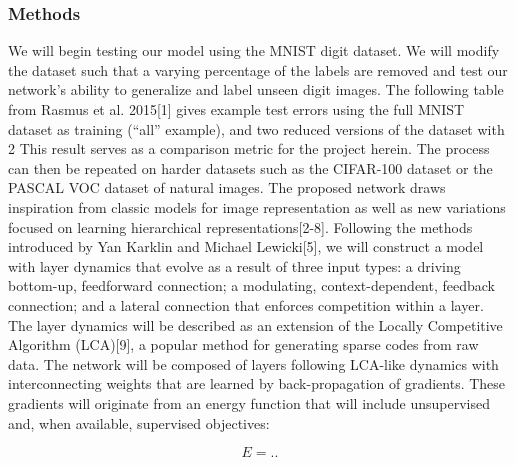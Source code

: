 \subsubsection{Methods}
We will begin testing our model using the MNIST digit dataset. We will modify the dataset such that a varying percentage of the labels are removed and test our network’s ability to generalize and label unseen digit images. The following table from Rasmus et al. 2015[1] gives example test errors using the full MNIST dataset as training (“all” example), and two reduced versions of the dataset with 2%
This result serves as a comparison metric for the project herein. The process can then be repeated on harder datasets such as the CIFAR-100 dataset or the PASCAL VOC dataset of natural images. 
The proposed network draws inspiration from classic models for image representation as well as new variations focused on learning hierarchical representations[2-8]. Following the methods introduced by Yan Karklin and Michael Lewicki[5], we will construct a model with layer dynamics that evolve as a result of three input types: a driving bottom-up, feedforward connection; a modulating, context-dependent, feedback connection; and a lateral connection that enforces competition within a layer. The layer dynamics will be described as an extension of the Locally Competitive Algorithm (LCA)[9], a popular method for generating sparse codes from raw data. The network will be composed of layers following LCA-like dynamics with interconnecting weights that are learned by back-propagation of gradients. These gradients will originate from an energy function that will include unsupervised and, when available, supervised objectives:

\begin{equation}\label{weakly_sup_energy}
E = ..
\end{equation}

